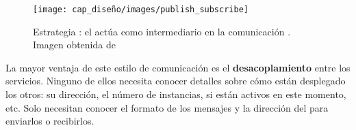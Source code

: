 \begin{figure}[htb]
  \centering
  \texttt{[image: cap\_diseño/images/publish\_subscribe]}
  \caption[Estrategia : el  actúa como intermediario en la comunicación .]{Estrategia : el  actúa como intermediario en la comunicación . Imagen obtenida de \footnotemark}
  \label{fig:publish-subscribe}
\end{figure}


La mayor ventaja de este estilo de comunicación es el \textbf{desacoplamiento} entre los servicios. \cite{korabUnderstandingMessageBrokers2017}
Ninguno de ellos necesita conocer detalles sobre cómo están desplegado los otros: su dirección, el número de instancias, si están activos en este momento, etc. Solo necesitan conocer el formato de los mensajes y la dirección del  para enviarlos o recibirlos.

